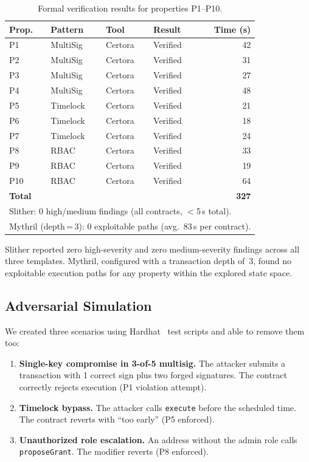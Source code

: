 \documentclass[conference]{IEEEtran}
\begin{document}
\begin{table}[!t]
\centering
\caption{Formal verification results for properties P1--P10.}
\label{tab:verification}
\small
\begin{tabular}{l l l l r}
\toprule
\textbf{Prop.} & \textbf{Pattern} & \textbf{Tool} & \textbf{Result} & \textbf{Time (s)} \\
\midrule
P1  & MultiSig  & Certora & Verified & 42 \\
P2  & MultiSig  & Certora & Verified & 31 \\
P3  & MultiSig  & Certora & Verified & 27 \\
P4  & MultiSig  & Certora & Verified & 48 \\
P5  & Timelock  & Certora & Verified & 21 \\
P6  & Timelock  & Certora & Verified & 18 \\
P7  & Timelock  & Certora & Verified & 24 \\
P8  & RBAC      & Certora & Verified & 33 \\
P9  & RBAC      & Certora & Verified & 19 \\
P10 & RBAC      & Certora & Verified & 64 \\
\midrule
\multicolumn{4}{l}{\textbf{Total}} & \textbf{327} \\
\bottomrule
\multicolumn{5}{l}{\footnotesize Slither: 0 high/medium findings (all contracts, $<$5\,s total).}\\
\multicolumn{5}{l}{\footnotesize Mythril (depth\,=\,3): 0 exploitable paths (avg.\ 83\,s per contract).}
\end{tabular}
\end{table}

Slither reported zero high-severity and zero medium-severity
findings across all three templates.  Mythril, configured with a
transaction depth of~3, found no exploitable execution paths for
any property within the explored state space.

\subsection{Adversarial Simulation}

We created  three scenarios using
Hardhat~\cite{hardhat2024} test scripts and able to remove them too:

\begin{enumerate}
  \item \textbf{Single-key compromise in 3-of-5 multisig.}  The
        attacker submits a transaction with 1 correct sign plus
        two forged signatures.  The contract correctly rejects
        execution (P1 violation attempt).
  \item \textbf{Timelock bypass.}  The attacker calls
        \texttt{execute} before the scheduled time.  The contract
        reverts with ``too early'' (P5 enforced).
  \item \textbf{Unauthorized role escalation.}  An address without
        the admin role calls \texttt{proposeGrant}.  The modifier
        reverts (P8 enforced).
\end{enumerate}
\end{document}
